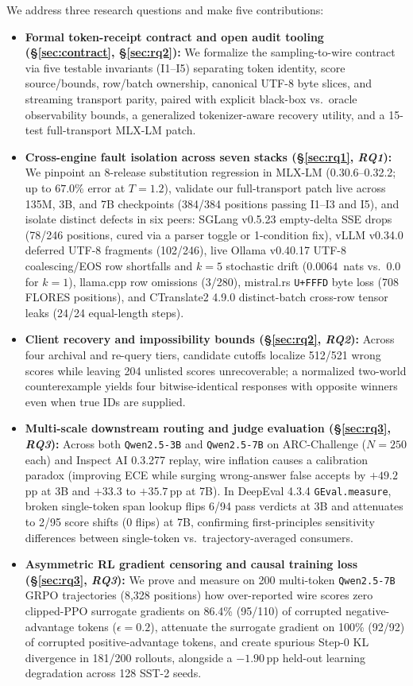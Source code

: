 \documentclass[11pt,letterpaper]{article}
\begin{document}
We address three research questions and make five contributions:
\begin{itemize}
\item \textbf{Formal token-receipt contract and open audit tooling (\S\ref{sec:contract}, \S\ref{sec:rq2}):} We formalize the sampling-to-wire contract via five testable invariants (\textsc{I1}--\textsc{I5}) separating token identity, score source/bounds, row/batch ownership, canonical UTF-8 byte slices, and streaming transport parity, paired with explicit black-box vs.\ oracle observability bounds, a generalized tokenizer-aware recovery utility, and a 15-test full-transport MLX-LM patch.
\item \textbf{Cross-engine fault isolation across seven stacks (\S\ref{sec:rq1}, \emph{RQ1}):} We pinpoint an 8-release substitution regression in MLX-LM (0.30.6--0.32.2; up to $67.0\%$ error at $T=1.2$), validate our full-transport patch live across 135M, 3B, and 7B checkpoints (384/384 positions passing \textsc{I1}--\textsc{I3} and \textsc{I5}), and isolate distinct defects in six peers: SGLang v0.5.23 empty-delta SSE drops (78/246 positions, cured via a parser toggle or 1-condition fix), vLLM v0.34.0 deferred UTF-8 fragments (102/246), live Ollama v0.40.17 UTF-8 coalescing/EOS row shortfalls and $k=5$ stochastic drift ($0.0064$~nats vs.\ $0.0$ for $k=1$), llama.cpp row omissions (3/280), mistral.rs \texttt{U+FFFD} byte loss (708 FLORES positions), and CTranslate2 4.9.0 distinct-batch cross-row tensor leaks (24/24 equal-length steps).
\item \textbf{Client recovery and impossibility bounds (\S\ref{sec:rq2}, \emph{RQ2}):} Across four archival and re-query tiers, candidate cutoffs localize 512/521 wrong scores while leaving 204 unlisted scores unrecoverable; a normalized two-world counterexample yields four bitwise-identical responses with opposite winners even when true IDs are supplied.
\item \textbf{Multi-scale downstream routing and judge evaluation (\S\ref{sec:rq3}, \emph{RQ3}):} Across both \texttt{Qwen2.5-3B} and \texttt{Qwen2.5-7B} on ARC-Challenge ($N=250$ each) and Inspect AI 0.3.277 replay, wire inflation causes a calibration paradox (improving ECE while surging wrong-answer false accepts by $+49.2$\,pp at 3B and $+33.3$ to $+35.7$\,pp at 7B). In DeepEval 4.3.4 \texttt{GEval.measure}, broken single-token span lookup flips 6/94 pass verdicts at 3B and attenuates to 2/95 score shifts (0 flips) at 7B, confirming first-principles sensitivity differences between single-token vs.\ trajectory-averaged consumers.
\item \textbf{Asymmetric RL gradient censoring and causal training loss (\S\ref{sec:rq3}, \emph{RQ3}):} We prove and measure on 200 multi-token \texttt{Qwen2.5-7B} GRPO trajectories (8,328 positions) how over-reported wire scores zero clipped-PPO surrogate gradients on 86.4\% (95/110) of corrupted negative-advantage tokens ($\epsilon=0.2$), attenuate the surrogate gradient on 100\% (92/92) of corrupted positive-advantage tokens, and create spurious Step-0 KL divergence in 181/200 rollouts, alongside a $-1.90$\,pp held-out learning degradation across 128 SST-2 seeds.
\end{itemize}
\end{document}
